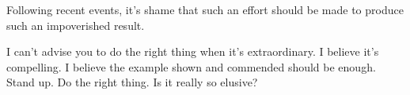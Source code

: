 

Following recent events, it's shame that such an effort should be made
to produce such an impoverished result.

I can't advise you to do the right thing when it's extraordinary.  I
believe it's compelling.  I believe the example shown and commended
should be enough.  Stand up.  Do the right thing.  Is it really so
elusive?

\bye
